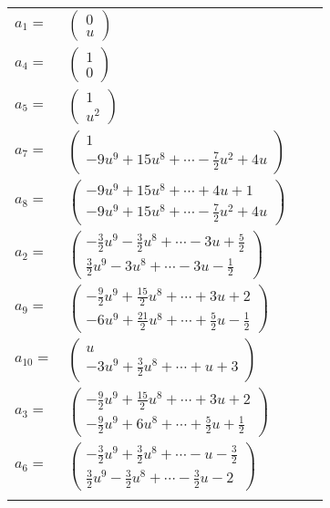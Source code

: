 \documentclass[1p]{elsarticle_modified}
\theoremstyle{definition}
\begin{document}
\begin{tabular}{m{7pt} m{180pt} m{7pt} m{180pt} }
\flushright $a_{1}=$&$\begin{pmatrix}0\\u\end{pmatrix}$ \\
\flushright $a_{4}=$&$\begin{pmatrix}1\\0\end{pmatrix}$ \\
\flushright $a_{5}=$&$\begin{pmatrix}1\\u^2\end{pmatrix}$ \\
\flushright $a_{7}=$&$\begin{pmatrix}1\\-9 u^9+15 u^8+\cdots-\frac{7}{2} u^2+4 u\end{pmatrix}$ \\
\flushright $a_{8}=$&$\begin{pmatrix}-9 u^9+15 u^8+\cdots+4 u+1\\-9 u^9+15 u^8+\cdots-\frac{7}{2} u^2+4 u\end{pmatrix}$ \\
\flushright $a_{2}=$&$\begin{pmatrix}-\frac{3}{2} u^9-\frac{3}{2} u^8+\cdots-3 u+\frac{5}{2}\\\frac{3}{2} u^9-3 u^8+\cdots-3 u-\frac{1}{2}\end{pmatrix}$ \\
\flushright $a_{9}=$&$\begin{pmatrix}-\frac{9}{2} u^9+\frac{15}{2} u^8+\cdots+3 u+2\\-6 u^9+\frac{21}{2} u^8+\cdots+\frac{5}{2} u-\frac{1}{2}\end{pmatrix}$ \\
\flushright $a_{10}=$&$\begin{pmatrix}u\\-3 u^9+\frac{3}{2} u^8+\cdots+u+3\end{pmatrix}$ \\
\flushright $a_{3}=$&$\begin{pmatrix}-\frac{9}{2} u^9+\frac{15}{2} u^8+\cdots+3 u+2\\-\frac{9}{2} u^9+6 u^8+\cdots+\frac{5}{2} u+\frac{1}{2}\end{pmatrix}$ \\
\flushright $a_{6}=$&$\begin{pmatrix}-\frac{3}{2} u^9+\frac{3}{2} u^8+\cdots- u-\frac{3}{2}\\\frac{3}{2} u^9-\frac{3}{2} u^8+\cdots-\frac{3}{2} u-2\end{pmatrix}$\\&\end{tabular}
\end{document}
